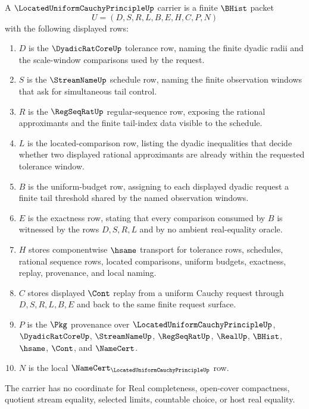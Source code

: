 \begin{definition}
\label{def:located-uniform-cauchy-principle-carrier}
A $\LocatedUniformCauchyPrincipleUp$ carrier is a finite $\BHist$ packet
$$
U=(D,S,R,L,B,E,H,C,P,N)
$$
with the following displayed rows:
\begin{enumerate}
\item $D$ is the $\DyadicRatCoreUp$ tolerance row, naming the finite dyadic radii and the scale-window comparisons used by the request.
\item $S$ is the $\StreamNameUp$ schedule row, naming the finite observation windows that ask for simultaneous tail control.
\item $R$ is the $\RegSeqRatUp$ regular-sequence row, exposing the rational approximants and the finite tail-index data visible to the schedule.
\item $L$ is the located-comparison row, listing the dyadic inequalities that decide whether two displayed rational approximants are already within the requested tolerance window.
\item $B$ is the uniform-budget row, assigning to each displayed dyadic request a finite tail threshold shared by the named observation windows.
\item $E$ is the exactness row, stating that every comparison consumed by $B$ is witnessed by the rows $D,S,R,L$ and by no ambient real-equality oracle.
\item $H$ stores componentwise $\hsame$ transport for tolerance rows, schedules, rational sequence rows, located comparisons, uniform budgets, exactness, replay, provenance, and local naming.
\item $C$ stores displayed $\Cont$ replay from a uniform Cauchy request through $D,S,R,L,B,E$ and back to the same finite request surface.
\item $P$ is the $\Pkg$ provenance over $\LocatedUniformCauchyPrincipleUp$, $\DyadicRatCoreUp$, $\StreamNameUp$, $\RegSeqRatUp$, $\RealUp$, $\BHist$, $\hsame$, $\Cont$, and $\NameCert$.
\item $N$ is the local $\NameCert_{\LocatedUniformCauchyPrincipleUp}$ row.
\end{enumerate}
The carrier has no coordinate for Real completeness, open-cover compactness, quotient stream equality, selected limits, countable choice, or host real equality.
\end{definition}

